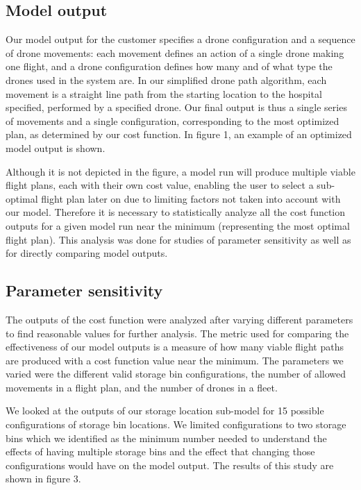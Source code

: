 \documentclass[twocolumn,10pt]{asme2ej}
\begin{document}
\subsection{Model output}
Our model output for the customer specifies a drone configuration and a sequence of drone movements: each movement defines an action of a single drone making one flight, and a drone configuration defines how many and of what type the drones used in the system are. In our simplified drone path algorithm, each movement is a straight line path from the starting location to the hospital specified, performed by a specified drone. Our final output is thus a single series of movements and a single configuration, corresponding to the most optimized plan, as determined by our cost function. In figure 1, an example of an optimized model output is shown. 

Although it is not depicted in the figure, a model run will produce multiple viable flight plans, each with their own cost value, enabling the user to select a sub-optimal flight plan later on due to limiting factors not taken into account with our model. Therefore it is necessary to statistically analyze all the cost function outputs for a given model run near the minimum (representing the most optimal flight plan). This analysis was done for studies of parameter sensitivity as well as for directly comparing model outputs.

\subsection{Parameter sensitivity}
The outputs of the cost function were analyzed after varying different parameters to find reasonable values for further analysis. The metric used for comparing the effectiveness of our model outputs is a measure of how many viable flight paths are produced with a cost function value near the minimum. The parameters we varied were the different valid storage bin configurations, the number of allowed movements in a flight plan, and the number of drones in a fleet.

We looked at the outputs of our storage location sub-model for 15 possible configurations of storage bin locations. We limited configurations to two storage bins which we identified as the minimum number needed to understand the effects of having multiple storage bins and the effect that changing those configurations would have on the model output. The results of this study are shown in figure 3.
\end{document}
